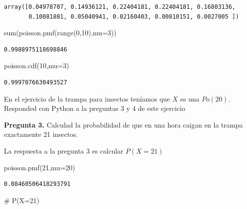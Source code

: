 \documentclass[
  letterpaper,
  DIV=11,
  numbers=noendperiod]{scrreprt}
\newenvironment{Shaded}{\begin{snugshade}}{\end{snugshade}}
\newcommand{\BuiltInTok}[1]{\textcolor[rgb]{0.00,0.23,0.31}{#1}}
\newcommand{\CommentTok}[1]{\textcolor[rgb]{0.37,0.37,0.37}{#1}}
\newcommand{\DecValTok}[1]{\textcolor[rgb]{0.68,0.00,0.00}{#1}}
\newcommand{\NormalTok}[1]{\textcolor[rgb]{0.00,0.23,0.31}{#1}}
\newcommand{\OperatorTok}[1]{\textcolor[rgb]{0.37,0.37,0.37}{#1}}
\begin{document}
\begin{verbatim}
array([0.04978707, 0.14936121, 0.22404181, 0.22404181, 0.16803136,
       0.10081881, 0.05040941, 0.02160403, 0.00810151, 0.0027005 ])
\end{verbatim}

\begin{Shaded}
\begin{Highlighting}[]
\BuiltInTok{sum}\NormalTok{(poisson.pmf(}\BuiltInTok{range}\NormalTok{(}\DecValTok{0}\NormalTok{,}\DecValTok{10}\NormalTok{),mu}\OperatorTok{=}\DecValTok{3}\NormalTok{))}
\end{Highlighting}
\end{Shaded}

\begin{verbatim}
0.9988975118698846
\end{verbatim}

\begin{Shaded}
\begin{Highlighting}[]
\NormalTok{poisson.cdf(}\DecValTok{10}\NormalTok{,mu}\OperatorTok{=}\DecValTok{3}\NormalTok{)}
\end{Highlighting}
\end{Shaded}

\begin{verbatim}
0.9997076630493527
\end{verbatim}

En el ejercicio de la trampa para insectos teníamos que \(X\) es una
\(Po(20)\). Responded con Python a la preguntas 3 y 4 de este ejercicio

\textbf{Pregunta 3.} Calculad la probabilidad de que en una hora caigan
en la trampa exactamente 21 insectos.

La respuesta a la pregunta 3 es calcular \(P(X=21)\)

\begin{Shaded}
\begin{Highlighting}[]
\NormalTok{poisson.pmf(}\DecValTok{21}\NormalTok{,mu}\OperatorTok{=}\DecValTok{20}\NormalTok{)}
\end{Highlighting}
\end{Shaded}

\begin{verbatim}
0.08460506418293791
\end{verbatim}

\begin{Shaded}
\begin{Highlighting}[]
\CommentTok{\# P(X=21)}
\end{Highlighting}
\end{Shaded}
\end{document}
